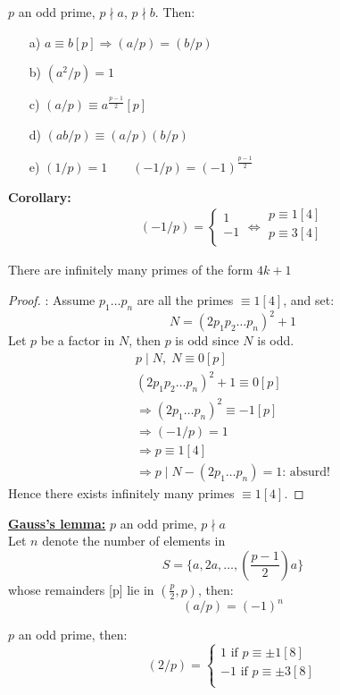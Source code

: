 \documentclass{report}
\begin{document}
\begin{thm} $p$ an odd prime, $p\nmid a$, $p\nmid b$. Then:
	\begin{itemize}
		\item[a)] $a\equiv b[p] \Rightarrow (a/p)=(b/p)$
		\item[b)] $(a^2/p)=1$
		\item[c)] $(a/p)\equiv a^\frac{p-1}{2}[p]$
		\item[d)] $(ab/p)\equiv (a/p)(b/p)$
		\item[e)] $(1/p)=1 \qquad (-1/p)=(-1)^\frac{p-1}{2}$
	\end{itemize}
\end{thm}
\textbf{Corollary:}\[(-1/p)=\left \{ \begin{array}{lcl}
1\\
-1\\
\end{array}
\right. \iff 
\begin{array}{lcl}
p\equiv 1[4]\\
p\equiv 3[4]\\
\end{array}\]
\begin{thm}There are infinitely many primes of the form $4k+1$\end{thm}
\begin{proof}: Assume $p_1 \dots p_n$ are all the primes $\equiv 1[4]$, and set:
	\[ N=(2p_1p_2\dots p_n)^2+1\]
	Let $p$ be a factor in $N$, then $p$ is odd since $N$ is odd.
	\[\begin{array}{lcl}
	p\mid N, \; N\equiv 0[p]\\
	(2p_1p_2\dots p_n)^2+1\equiv 0[p]\\
	\Rightarrow (2p_1\dots p_n)^2\equiv -1[p]\\
	\Rightarrow (-1/p)=1\\
	\Rightarrow p\equiv 1[4]\\
	\Rightarrow p \mid N-(2p_1\dots p_n)=1\text{: absurd!}
	\end{array}
	\]
	Hence there exists infinitely many primes $\equiv 1[4]$.
\end{proof}						
\underline{\textbf{Gauss's lemma:}} $p$ an odd prime, $p\nmid a$\\
Let $n$ denote the number of elements in \[ S=\{a,2a,\dots,({\scriptstyle \frac{p-1}{2}})a\}\] whose remainders [p] lie in $(\frac{p}{2},p)$, then: \[(a/p)=(-1)^n\]
\begin{thm} $p$ an odd prime, then:
	\[(2/p)=\left \{
	\begin{array}{lcl}
	1 \text{ if } p\equiv \pm 1[8]\\
	-1 \text{ if } p\equiv \pm 3[8]\\
	\end{array}
	\right.\]
\end{thm}
\end{document}
